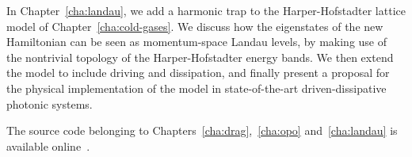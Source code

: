 In Chapter~\ref{cha:landau}, we add a harmonic trap to the
Harper-Hofstadter lattice model of Chapter~\ref{cha:cold-gases}. We
discuss how the eigenstates of the new Hamiltonian can be seen as
momentum-space Landau levels, by making use of the nontrivial topology
of the Harper-Hofstadter energy bands. We then extend the model to
include driving and dissipation, and finally present a proposal for
the physical implementation of the model in state-of-the-art
driven-dissipative photonic systems.

The source code belonging to Chapters~\ref{cha:drag},~\ref{cha:opo}
and~\ref{cha:landau} is available online~\cite{SourceCode}.


